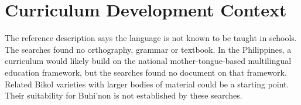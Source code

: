 \documentclass[12pt]{article}
\begin{document}
\section{Curriculum Development Context}
The reference description says the language is not known to be taught in schools. The searches found no orthography, grammar or textbook. In the Philippines, a curriculum would likely build on the national mother-tongue-based multilingual education framework, but the searches found no document on that framework. Related Bikol varieties with larger bodies of material could be a starting point. Their suitability for Buhi'non is not established by these searches.
\end{document}
